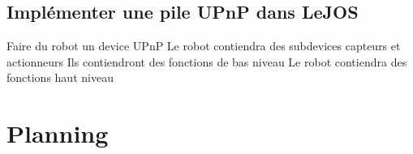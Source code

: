\documentclass{article}
\begin{document}
		\subsection{Impl\'ementer une pile UPnP dans LeJOS}
			Faire du robot un device UPnP
				Le robot contiendra des subdevices capteurs et actionneurs
					Ils contiendront des fonctions de bas niveau
				Le robot contiendra des fonctions haut niveau
	
	\newpage
				
	\section{Planning}
	
\end{document}
